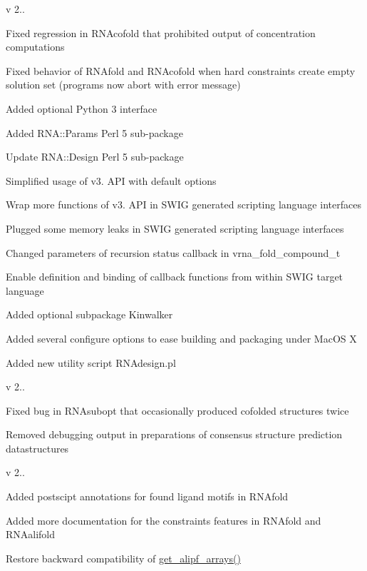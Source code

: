 v 2..
\begin{DoxyItemize}
\item Fixed regression in R\+N\+Acofold that prohibited output of concentration computations
\item Fixed behavior of R\+N\+Afold and R\+N\+Acofold when hard constraints create empty solution set (programs now abort with error message)
\item Added optional Python 3 interface
\item Added R\+N\+A\+::\+Params Perl 5 sub-\/package
\item Update R\+N\+A\+::\+Design Perl 5 sub-\/package
\item Simplified usage of v3. A\+PI with default options
\item Wrap more functions of v3. A\+PI in S\+W\+IG generated scripting language interfaces
\item Plugged some memory leaks in S\+W\+IG generated scripting language interfaces
\item Changed parameters of recursion status callback in vrna\+\_\+fold\+\_\+compound\+\_\+t
\item Enable definition and binding of callback functions from within S\+W\+IG target language
\item Added optional subpackage Kinwalker
\item Added several configure options to ease building and packaging under Mac\+OS X
\item Added new utility script R\+N\+Adesign.\+pl
\end{DoxyItemize}

v 2..
\begin{DoxyItemize}
\item Fixed bug in R\+N\+Asubopt that occasionally produced cofolded structures twice
\item Removed debugging output in preparations of consensus structure prediction datastructures
\end{DoxyItemize}

v 2..
\begin{DoxyItemize}
\item Added postscipt annotations for found ligand motifs in R\+N\+Afold
\item Added more documentation for the constraints features in R\+N\+Afold and R\+N\+Aalifold
\item Restore backward compatibility of \hyperlink{group__consensus__fold_ga5349960075b1847720a2e9df021e2675}{get\+\_\+alipf\+\_\+arrays()}
\end{DoxyItemize}

